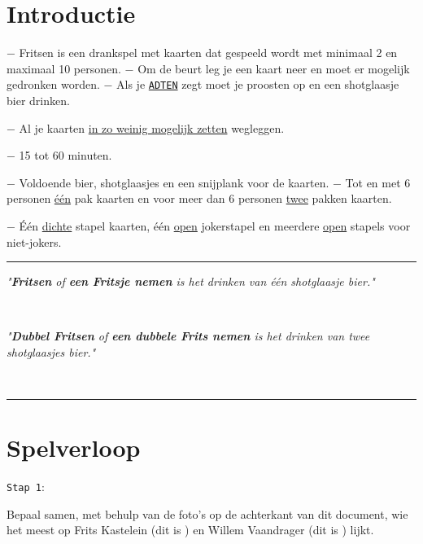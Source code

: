 \vspace{-0.5cm}
\section*{Introductie}
$-$ Fritsen is een drankspel met kaarten dat gespeeld wordt met minimaal 2 en maximaal 10 personen. \newline $-$ Om de beurt leg je een kaart neer en moet er mogelijk gedronken worden. \newline $-$ Als je \ul{\texttt{ADTEN}} zegt moet je proosten op  en een shotglaasje bier drinken. 
\vspace*{-0.22cm} 

$-$ Al je kaarten \ul{in zo weinig mogelijk zetten} wegleggen.

\vspace*{-0.22cm} 

$-$ 15 tot 60 minuten.

\vspace*{-0.22cm} 

$-$ Voldoende bier, shotglaasjes en een snijplank voor de kaarten. \newline $-$ Tot en met 6 personen \ul{\'e\'en} pak kaarten en voor meer dan 6 personen \ul{twee} pakken kaarten.

\vspace*{-0.22cm} 

$-$ \'E\'en \ul{dichte} stapel kaarten, \'e\'en \ul{open} jokerstapel en meerdere \ul{open} stapels voor niet-jokers.

\noindent\rule{\textwidth}{1pt}
\centerline{\textit{"\textbf{Fritsen} of \textbf{een Fritsje nemen} is het drinken van één shotglaasje bier."}} \\
\centerline{\textit{"\textbf{Dubbel Fritsen} of \textbf{een dubbele Frits nemen} is het drinken van twee shotglaasjes bier."}} \vspace*{-0.7cm}  \\
\noindent\rule{\textwidth}{1pt}

\vspace*{-0.45cm}

\section*{Spelverloop}
\label{sec:introductie}
\begin{minipage}[t]{.09\textwidth}
\texttt{Stap 1}:
\end{minipage}
\hfill
\begin{minipage}[t]{.91\textwidth}
Bepaal samen, met behulp van de foto's op de achterkant van dit document, wie het meest op Frits Kastelein (dit is \FritsN) en Willem Vaandrager (dit is \WillemN
) lijkt. \\
\end{minipage}

